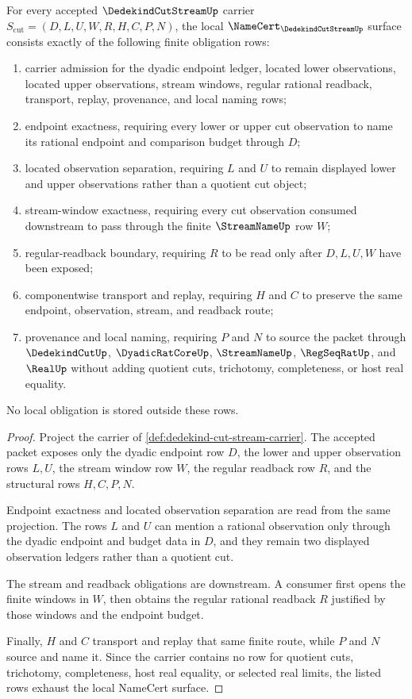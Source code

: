 \begin{theorem}\label{thm:dedekind-cut-stream-namecert-obligations}
For every accepted $\DedekindCutStreamUp$ carrier $S_{\mathrm{cut}}=(D,L,U,W,R,H,C,P,N)$, the local $\NameCert_{\DedekindCutStreamUp}$ surface consists exactly of the following finite obligation rows:
\begin{enumerate}
\item carrier admission for the dyadic endpoint ledger, located lower observations, located upper observations, stream windows, regular rational readback, transport, replay, provenance, and local naming rows;
\item endpoint exactness, requiring every lower or upper cut observation to name its rational endpoint and comparison budget through $D$;
\item located observation separation, requiring $L$ and $U$ to remain displayed lower and upper observations rather than a quotient cut object;
\item stream-window exactness, requiring every cut observation consumed downstream to pass through the finite $\StreamNameUp$ row $W$;
\item regular-readback boundary, requiring $R$ to be read only after $D,L,U,W$ have been exposed;
\item componentwise transport and replay, requiring $H$ and $C$ to preserve the same endpoint, observation, stream, and readback route;
\item provenance and local naming, requiring $P$ and $N$ to source the packet through $\DedekindCutUp$, $\DyadicRatCoreUp$, $\StreamNameUp$, $\RegSeqRatUp$, and $\RealUp$ without adding quotient cuts, trichotomy, completeness, or host real equality.
\end{enumerate}
No local obligation is stored outside these rows.
\end{theorem}
\begin{proof}
Project the carrier of \autoref{def:dedekind-cut-stream-carrier}. The accepted packet exposes only the dyadic endpoint row $D$, the lower and upper observation rows $L,U$, the stream window row $W$, the regular readback row $R$, and the structural rows $H,C,P,N$.

Endpoint exactness and located observation separation are read from the same projection. The rows $L$ and $U$ can mention a rational observation only through the dyadic endpoint and budget data in $D$, and they remain two displayed observation ledgers rather than a quotient cut.

The stream and readback obligations are downstream. A consumer first opens the finite windows in $W$, then obtains the regular rational readback $R$ justified by those windows and the endpoint budget.

Finally, $H$ and $C$ transport and replay that same finite route, while $P$ and $N$ source and name it. Since the carrier contains no row for quotient cuts, trichotomy, completeness, host real equality, or selected real limits, the listed rows exhaust the local NameCert surface.
\end{proof}

